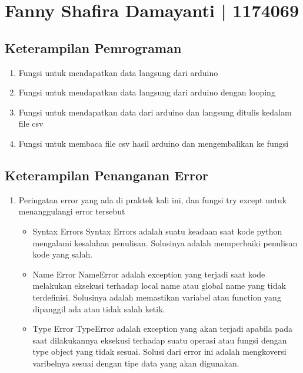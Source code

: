 \section{Fanny Shafira Damayanti | 1174069}
\subsection{Keterampilan Pemrograman}
\begin{enumerate}
\item Fungsi untuk mendapatkan data langsung dari arduino



\item Fungsi untuk mendapatkan data langsung dari arduino dengan looping


\item Fungsi untuk mendapatkan data dari arduino dan langsung ditulis kedalam file csv


\item Fungsi untuk membaca file csv hasil arduino dan mengembalikan ke fungsi



\end{enumerate}

\subsection{Keterampilan Penanganan Error}
\begin{enumerate}
\item Peringatan error yang ada di praktek kali ini, dan fungsi try except untuk menanggulangi error tersebut

\begin{itemize}
	\item Syntax Errors
	Syntax Errors adalah suatu keadaan saat kode python mengalami kesalahan penulisan. Solusinya adalah memperbaiki penulisan kode yang salah.
	
	\item Name Error
	NameError adalah exception yang terjadi saat kode melakukan eksekusi terhadap local name atau global name yang tidak terdefinisi. Solusinya adalah memastikan variabel atau function yang dipanggil ada atau tidak salah ketik.
	
	\item Type Error
	TypeError adalah exception yang akan terjadi apabila pada saat dilakukannya eksekusi terhadap suatu operasi atau fungsi dengan type object yang tidak sesuai. Solusi dari error ini adalah mengkoversi varibelnya sesuai dengan tipe data yang akan digunakan.
\end{itemize}


\end{enumerate}